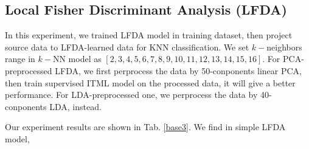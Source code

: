 \documentclass[conference]{IEEEtran}
\begin{document}
\subsection{Local Fisher Discriminant Analysis (LFDA)}


In this experiment, we trained LFDA model in training dataset, then project source data to LFDA-learned data for KNN classification. We set $k-$neighbors range in $k-$NN model as $[2, 3, 4, 5, 6, 7, 8, 9, 10, 11, 12, 13, 14, 15, 16]$. For PCA-preprocessed LFDA, we first perprocess the data by 50-conponents linear PCA, then train supervised ITML model on the processed data, it will give a better performance. For LDA-preprocessed one, we perprocess the data by 40-conponents LDA, instead.

Our experiment results are shown in Tab. \ref{base3}. We find in simple LFDA model, 
\end{document}
